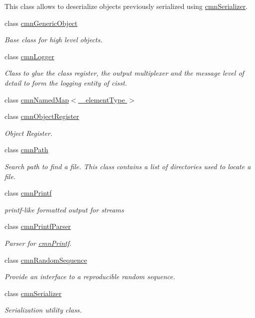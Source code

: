 \begin{DoxyCompactItemize}
\begin{DoxyCompactList}
This class allows to deserialize objects previously serialized using \hyperlink{classcmn_serializer}{cmn\+Serializer}. \end{DoxyCompactList}\item 
class \hyperlink{classcmn_generic_object}{cmn\+Generic\+Object}
\begin{DoxyCompactList}\small\item\em Base class for high level objects. \end{DoxyCompactList}\item 
class \hyperlink{classcmn_logger}{cmn\+Logger}
\begin{DoxyCompactList}\small\item\em Class to glue the class register, the output multiplexer and the message level of detail to form the logging entity of cisst. \end{DoxyCompactList}\item 
class \hyperlink{classcmn_named_map}{cmn\+Named\+Map$<$ \+\_\+element\+Type $>$}
\item 
class \hyperlink{classcmn_object_register}{cmn\+Object\+Register}
\begin{DoxyCompactList}\small\item\em Object Register. \end{DoxyCompactList}\item 
class \hyperlink{classcmn_path}{cmn\+Path}
\begin{DoxyCompactList}\small\item\em Search path to find a file. This class contains a list of directories used to locate a file. \end{DoxyCompactList}\item 
class \hyperlink{classcmn_printf}{cmn\+Printf}
\begin{DoxyCompactList}\small\item\em printf-\/like formatted output for streams \end{DoxyCompactList}\item 
class \hyperlink{classcmn_printf_parser}{cmn\+Printf\+Parser}
\begin{DoxyCompactList}\small\item\em Parser for \hyperlink{classcmn_printf}{cmn\+Printf}. \end{DoxyCompactList}\item 
class \hyperlink{classcmn_random_sequence}{cmn\+Random\+Sequence}
\begin{DoxyCompactList}\small\item\em Provide an interface to a reproducible random sequence. \end{DoxyCompactList}\item 
class \hyperlink{classcmn_serializer}{cmn\+Serializer}
\begin{DoxyCompactList}\small\item\em Serialization utility class.


\end{DoxyCompactList}
\end{DoxyCompactItemize}
